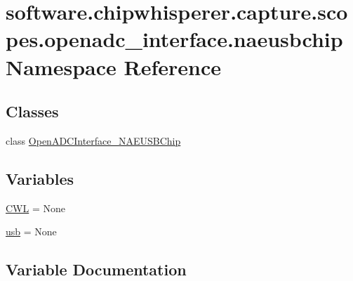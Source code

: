 \hypertarget{namespacesoftware_1_1chipwhisperer_1_1capture_1_1scopes_1_1openadc__interface_1_1naeusbchip}{}\section{software.\+chipwhisperer.\+capture.\+scopes.\+openadc\+\_\+interface.\+naeusbchip Namespace Reference}
\label{namespacesoftware_1_1chipwhisperer_1_1capture_1_1scopes_1_1openadc__interface_1_1naeusbchip}
\subsection*{Classes}
\begin{DoxyCompactItemize}
\item 
class \hyperlink{classsoftware_1_1chipwhisperer_1_1capture_1_1scopes_1_1openadc__interface_1_1naeusbchip_1_1OpenADCInterface__NAEUSBChip}{Open\+A\+D\+C\+Interface\+\_\+\+N\+A\+E\+U\+S\+B\+Chip}
\end{DoxyCompactItemize}
\subsection*{Variables}
\begin{DoxyCompactItemize}
\item 
\hyperlink{namespacesoftware_1_1chipwhisperer_1_1capture_1_1scopes_1_1openadc__interface_1_1naeusbchip_a6834c93edea5391aeff3f3f6b8198897}{C\+W\+L} = None
\item 
\hyperlink{namespacesoftware_1_1chipwhisperer_1_1capture_1_1scopes_1_1openadc__interface_1_1naeusbchip_a7884c52956f0d1b5afb04bebea415951}{usb} = None
\end{DoxyCompactItemize}


\subsection{Variable Documentation}
\hypertarget{namespacesoftware_1_1chipwhisperer_1_1capture_1_1scopes_1_1openadc__interface_1_1naeusbchip_a6834c93edea5391aeff3f3f6b8198897}{}
